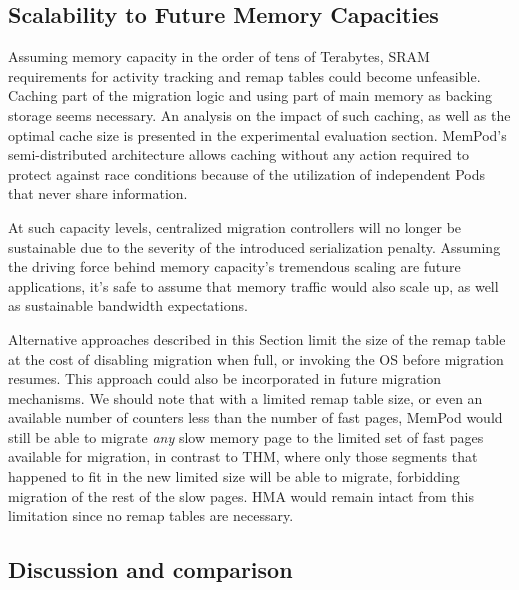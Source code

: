 
\subsection{Scalability to Future Memory Capacities}
Assuming memory capacity in the order of tens of Terabytes, SRAM requirements for activity tracking and remap tables could become unfeasible. Caching part of the migration logic and using part of main memory as backing storage seems necessary. An analysis on the impact of such caching, as well as the optimal cache size is presented in the experimental evaluation section. MemPod's semi-distributed architecture allows caching without any action required to protect against race conditions because of the utilization of independent Pods that never share information.

At such capacity levels, centralized migration controllers will no longer be sustainable due to the severity of the introduced serialization penalty. Assuming the driving force behind memory capacity's tremendous scaling are future applications, it's safe to assume that memory traffic would also scale up, as well as sustainable bandwidth expectations. 

Alternative approaches described in this Section limit the size of the remap table at the cost of disabling migration when full, or invoking the OS before migration resumes. This approach could also be incorporated in future migration mechanisms. We should note that with a limited remap table size, or even an available number of counters less than the number of fast pages, MemPod would still be able to migrate \textit{any} slow memory page to the limited set of fast pages available for migration, in contrast to THM, where only those segments that happened to fit in the new limited size will be able to migrate, forbidding migration of the rest of the slow pages. HMA would remain intact from this limitation since no remap tables are necessary.

\subsection{Discussion and comparison}



















































